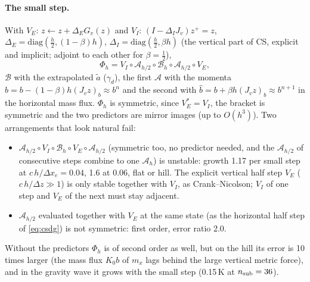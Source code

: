 \documentclass[11pt,a4paper]{article}
\begin{document}
\paragraph{The small step.} With $V_E$: $z\leftarrow z+\Delta_EG_v(z)$ and $V_I$: $(I-\Delta_IJ_v)z^+=z$,
$\Delta_E=\mathrm{diag}(\tfrac h2,(1-\beta)h)$, $\Delta_I=\mathrm{diag}(\tfrac h2,\beta h)$ (the vertical part of CS, explicit and
implicit; adjoint to each other for $\beta=\tfrac12$),
\[
\Phi_h=V_I\circ\mathcal A_{h/2}\circ\mathcal B_h\circ\mathcal A_{h/2}\circ V_E,
\]
$\mathcal B$ with the extrapolated $\tilde a$ ($\gamma_d$), the first $\mathcal A$ with the momenta $\hat b=b-(1-\beta)h(J_vz)_b\approx b^n$ and the second
with $\hat b=b+\beta h(J_vz)_b\approx b^{n+1}$ in the horizontal mass flux. $\Phi_h$ is symmetric, since $V_E^*=V_I$, the bracket is
symmetric and the two predictors are mirror images (up to $O(h^3)$). Two arrangements that look natural fail:
\begin{itemize}
\item $\mathcal A_{h/2}\circ V_I\circ\mathcal B_h\circ V_E\circ\mathcal A_{h/2}$ (symmetric too, no predictor needed, and the $\mathcal A_{h/2}$ of
  consecutive steps combine to one $\mathcal A_h$) is unstable: growth 1.17 per small step at $c\,h/\Delta x_e=0.04$, 1.6 at 0.06, flat or hill.
  The explicit vertical half step $V_E$ ($c\,h/\Delta z\gg1$) is only stable together with $V_I$, as Crank--Nicolson; $V_I$ of one step and
  $V_E$ of the next must stay adjacent.
\item $\mathcal A_{h/2}$ evaluated together with $V_E$ at the same state (as the horizontal half step of \eqref{eq:csdg}) is not
  symmetric: first order, error ratio 2.0.
\end{itemize}
Without the predictors $\Phi_h$ is of second order as well, but on the hill its error is 10 times larger (the mass flux $K_0b$ of
$m_x$ lags behind the large vertical metric force), and in the gravity wave it grows with the small step (0.15\,K at $n_{\rm sub}=36$).
\end{document}
